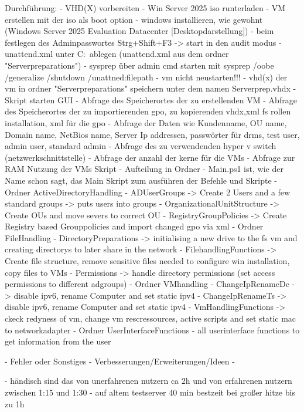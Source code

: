 \documentclass[conference]{IEEEtran}
\begin{document}
Durchführung:
- VHD(X) vorbereiten
    - Win Server 2025 iso runterladen
    - VM erstellen mit der iso als boot option
    - windows installieren, wie gewohnt (Windows Server 2025 Evaluation Datacenter [Desktopdarstellung])
    - beim festlegen des Adminpasswortes Strg+Shift+F3 -> start in den audit modus
    - unattend.xml unter C:\ ablegen (unattend.xml aus dem ordner "Serverpreparations")
    - sysprep über admin cmd starten mit sysprep /oobe /generalize /shutdown /unattned:filepath
    - vm nicht neustarten!!!
    - vhd(x) der vm in ordner "Serverpreparations" speichern unter dem namen Serverprep.vhdx
- Skript starten
    GUI
    - Abfrage des Speicherortes der zu erstellenden VM
    - Abfrage des Speicherortes der zu importierenden gpo, zu kopierenden vhdx,xml fs rollen installation, xml für die gpo
    - Abfrage der Daten wie Kundenname, OU name, Domain name, NetBios name, Server Ip addressen, passwörter für drms, test user, admin user, standard admin
    - Abfrage des zu verwendenden hyper v switch (netzwerkschnittstelle) 
    - Abfrage der anzahl der kerne für die VMs
    - Abfrage zur RAM Nutzung der VMs
    Skript
        - Aufteilung in Ordner 
        - Main.ps1 ist, wie der Name schon sagt, das Main Skript zum ausführen der Befehle und Skripte 
    - Ordner ActiveDirectoryHandling
        - ADUserGroups -> Create 2 Users and a few standard groups -> puts users into groups
        - OrganizationalUnitStructure -> Create OUs and move severs to correct OU
        - RegistryGroupPolicies -> Create Registry based Grouppolicies and import changed gpo via xml
    - Ordner FileHandling
        - DirectoryPreparations -> initialising a new drive to the fs vm and creating directorys to later share in the network
        - FilehandlingFunctions -> Create file structure, remove sensitive files needed to configure win installation, copy files to VMs
        - Permissions -> handle directory permissions (set access permissions to different adgroups)
    - Ordner VMhandling
        - ChangeIpRenameDc -> disable ipv6, rename Computer and set static ipv4
        - ChangeIpRenameTs -> disable ipv6, rename Computer and set static ipv4
        - VmHandlingFunctions -> ckeck redyness of vm, change vm rescressources, active scripts and set static mac to networkadapter 
    - Ordner UserInterfaceFunctions
        - all userinterface functions to get information from the user
    
- Fehler oder Sonstiges
- Verbesserungen/Erweiterungen/Ideen
    - 


    - händisch sind das von unerfahrenen nutzern ca 2h und von erfahrenen nutzern zwischen 1:15 und 1:30
    - auf altem testserver 40 min bestzeit bei großer hitze bis zu 1h
\end{document}
